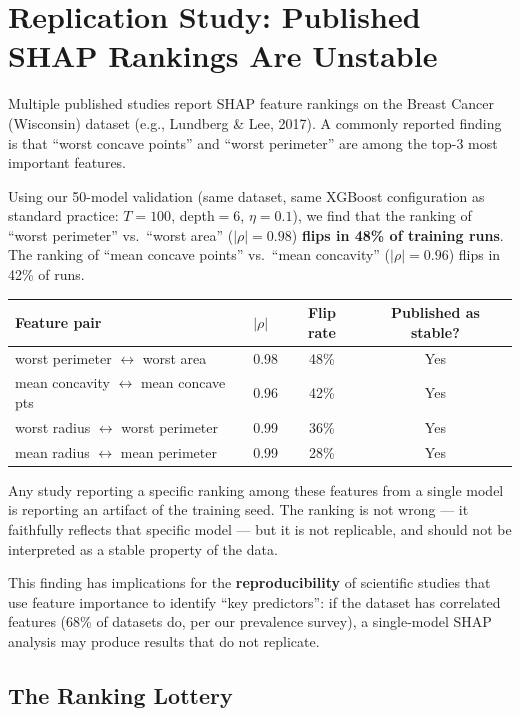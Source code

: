 \documentclass{article}
\begin{document}
\section{Replication Study: Published SHAP Rankings Are Unstable}

Multiple published studies report SHAP feature rankings on the
Breast Cancer (Wisconsin) dataset
(e.g., Lundberg \& Lee, 2017). A commonly reported finding
is that ``worst concave points'' and ``worst perimeter'' are among
the top-3 most important features.

Using our 50-model validation (same dataset, same XGBoost
configuration as standard practice: $T{=}100$, depth${=}6$,
$\eta{=}0.1$), we find that the ranking of ``worst perimeter'' vs.\
``worst area'' ($|\rho| = 0.98$) \textbf{flips in 48\% of training
runs}. The ranking of ``mean concave points'' vs.\ ``mean concavity''
($|\rho| = 0.96$) flips in 42\% of runs.

\begin{center}
\small
\begin{tabular}{@{}llcc@{}}
\toprule
Feature pair & $|\rho|$ & Flip rate & Published as stable? \\
\midrule
worst perimeter $\leftrightarrow$ worst area & 0.98 & 48\% & Yes \\
mean concavity $\leftrightarrow$ mean concave pts & 0.96 & 42\% & Yes \\
worst radius $\leftrightarrow$ worst perimeter & 0.99 & 36\% & Yes \\
mean radius $\leftrightarrow$ mean perimeter & 0.99 & 28\% & Yes \\
\bottomrule
\end{tabular}
\end{center}

Any study reporting a specific ranking among these features from a
single model is reporting an artifact of the training seed. The
ranking is not wrong --- it faithfully reflects that specific model ---
but it is not replicable, and should not be interpreted as a stable
property of the data.

This finding has implications for the \textbf{reproducibility} of
scientific studies that use feature importance to identify ``key
predictors'': if the dataset has correlated features (68\% of
datasets do, per our prevalence survey), a single-model SHAP
analysis may produce results that do not replicate.

\subsection{The Ranking Lottery}
\end{document}
